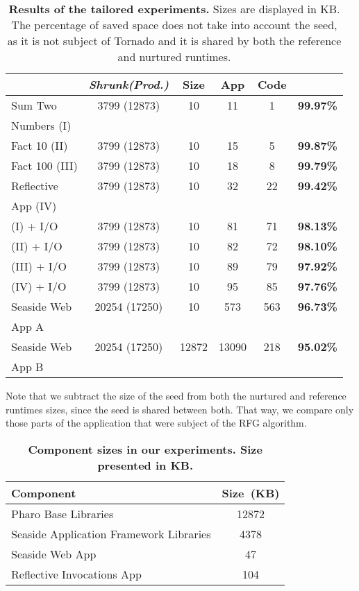 \begin{description}
\begin{table}[ht]
\begin{tabular}{lccccc}
 			& \textbf{\emph{Shrunk(Prod.)}}
			& \textbf{Size}
			& \textbf{App}
			& \textbf{Code}
			& \textbf{}\\
		\toprule
		Sum Two
 			&  3799 (12873) & 10 & 11 & 1 & \textbf{99.97\%}\\
		Numbers (I)
 			& &&&&\\
		\midrule
		Fact 10 (II)
 			& 3799 (12873) & 10 & 15 & 5 & \textbf{99.87\%}\\
		\midrule
		Fact 100 (III)
 			& 3799 (12873) & 10 & 18 & 8 & \textbf{99.79\%}\\
		\midrule
		Reflective
 			& 3799 (12873) & 10 & 32 & 22 & \textbf{99.42\%}\\
		App (IV)&&&&&\\
		\midrule
		(I) + I/O
 			& 3799 (12873) & 10 & 81 & 71 & \textbf{98.13\%}\\
		\midrule
		(II) + I/O
 			& 3799 (12873) & 10 & 82 & 72 & \textbf{98.10\%}\\
		\midrule
		(III) + I/O
 			& 3799 (12873) & 10 & 89 & 79 & \textbf{97.92\%}\\
		\midrule
		(IV) + I/O
 			& 3799 (12873) & 10 & 95 & 85 & \textbf{97.76\%}\\
		\midrule
		Seaside Web
 			& 20254 (17250) & 10 & 573 & 563 & \textbf{96.73\%}\\
		App A&&&&&\\
		\midrule
		Seaside Web
 			& 20254 (17250) & 12872 & 13090 & 218 & \textbf{95.02\%}\\
		App B&&&&&\\
		\bottomrule
 	\end{tabular}
 	\caption{\small\textbf{Results of the tailored experiments.} Sizes are displayed in KB. The percentage of saved space does not take into account the seed, as it is not subject of Tornado and it is shared by both the reference and nurtured runtimes.}
 	\label{tb:results}
 \end{table}


Note that we subtract the size of the seed from both the nurtured and reference runtimes sizes, since the seed is shared between both. That way, we compare only those parts of the application that were subject of the RFG algorithm.

\end{description}

 \begin{table}[ht]
 	\centering
 	\begin{tabular}{lc}
			\toprule
			\textbf{Component}
 			& \textbf{Size~(KB)}\\
		\toprule
		Pharo Base Libraries & 12872\\\midrule
		Seaside Application Framework Libraries & 4378\\\midrule
		Seaside Web App & 47\\\midrule
		Reflective Invocations App & 104\\\bottomrule
 	\end{tabular}
 	\caption{\small\textbf{Component sizes in our experiments. Size presented in KB.} \label{tb:tailored_components}}
 	\label{tb:basic_sizes}
 \end{table}

